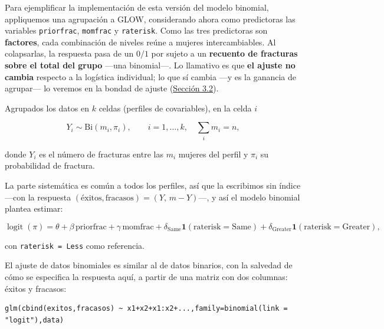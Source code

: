 \documentclass[
  letterpaper,
  DIV=11,
  numbers=noendperiod]{scrartcl}
\begin{document}
Para ejemplificar la implementación de esta versión del modelo binomial,
appliquemos una agrupación a GLOW, considerando ahora como predictoras
las variables \texttt{priorfrac}, \texttt{momfrac} y \texttt{raterisk}.
Como las tres predictoras son \textbf{factores}, cada combinación de
niveles reúne a mujeres intercambiables. Al colapsarlas, la respuesta
pasa de un \(0/1\) por sujeto a un \textbf{recuento de fracturas sobre
el total del grupo} ---una binomial---. Lo llamativo es que \textbf{el
ajuste no cambia} respecto a la logística individual; lo que sí cambia
---y es la ganancia de agrupar--- lo veremos en la bondad de ajuste
(\protect\hyperlink{sec-u13-gof-binomial}{Sección 3.2}).

Agrupados los datos en \(k\) celdas (perfiles de covariables), en la
celda \(i\)

\[Y_i \sim \mathrm{Bi}(m_i,\pi_i), \qquad i=1,\dots,k,\quad \textstyle\sum_i m_i=n,\]

donde \(Y_i\) es el número de fracturas entre las \(m_i\) mujeres del
perfil y \(\pi_i\) su probabilidad de fractura.

La parte sistemática es común a todos los perfiles, así que la
escribimos sin índice ---con la respuesta
\((\text{éxitos},\text{fracasos})=(Y,\,m-Y)\)---, y así el modelo
binomial plantea estimar:

\[\operatorname{logit}(\pi)=\theta+\beta\,\text{priorfrac}+\gamma\,\text{momfrac}+\delta_{\text{Same}}\mathbf 1(\text{raterisk}=\text{Same})+\delta_{\text{Greater}}\mathbf 1(\text{raterisk}=\text{Greater}),\]

con \texttt{raterisk\ =\ Less} como referencia.

\begin{tcolorbox}[enhanced jigsaw, coltitle=black, rightrule=.15mm, arc=.35mm, leftrule=.75mm, colback=white, colbacktitle=quarto-callout-tip-color!10!white, left=2mm, breakable, toptitle=1mm, toprule=.15mm, bottomtitle=1mm, titlerule=0mm, title=\textcolor{quarto-callout-tip-color}{\faLightbulb}\hspace{0.5em}{🔧 En R. El \texttt{glm()} con datos binomiales}, bottomrule=.15mm, opacityback=0, opacitybacktitle=0.6, colframe=quarto-callout-tip-color-frame]

El ajuste de datos binomiales es similar al de datos binarios, con la
salvedad de cómo se especifica la respuesta aquí, a partir de una matriz
con dos columnas: éxitos y fracasos:

\begin{verbatim}
glm(cbind(exitos,fracasos) ~ x1+x2+x1:x2+...,family=binomial(link = "logit"),data)
\end{verbatim}

\end{tcolorbox}
\end{document}
